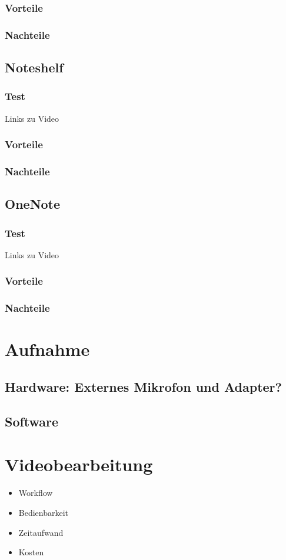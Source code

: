 \documentclass[parskip=off,index=totocnumbered]{scrreprt}
\begin{document}
\subsection{Vorteile}
\subsection{Nachteile}

\section{Noteshelf}
\subsection{Test}
Links zu Video
\subsection{Vorteile}
\subsection{Nachteile}

\section{OneNote}
\subsection{Test}
Links zu Video
\subsection{Vorteile}
\subsection{Nachteile}

\chapter{Aufnahme}
\section{Hardware: Externes Mikrofon und Adapter?}
\section{Software}

\chapter{Videobearbeitung}
   \begin{itemize}
      \item Workflow
      \item Bedienbarkeit
      \item Zeitaufwand
      \item Kosten
   \end{itemize}
\end{document}
